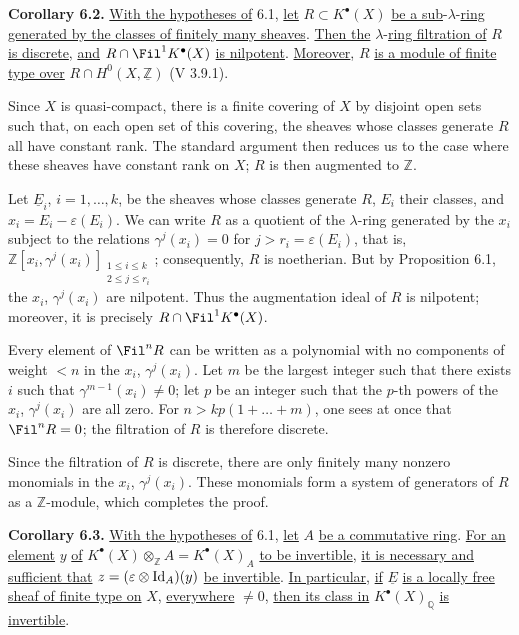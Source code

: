 %
\textbf{Corollary 6.2.} \uline{With the hypotheses of} 6.1, \uline{let} $R\subset K^{\bullet}(X)$ \uline{be a sub}-$\lambda$-\uline{ring generated by the classes of finitely many sheaves}. \uline{Then the} $\lambda$-\uline{ring filtration of} $R$ \uline{is discrete}, \uline{and} $R\cap\Fil^1K^{\bullet}(X)$ \uline{is nilpotent}. \uline{Moreover}, $R$ \uline{is a module of finite type over} $R\cap H^0(X,\underline{\mathbb Z})$ (V 3.9.1).

Since $X$ is quasi-compact, there is a finite covering of $X$ by disjoint open sets such that, on each open set of this covering, the sheaves whose classes generate $R$ all have constant rank. The standard argument then reduces us to the case where these sheaves have constant rank on $X$; $R$ is then augmented to $\mathbb Z$.

Let $\underline{E}_i$, $i=1,\ldots,k$, be the sheaves whose classes generate $R$, $E_i$ their classes, and $x_i=E_i-\varepsilon(E_i)$. We can write $R$ as a quotient of the $\lambda$-ring generated by the $x_i$ subject to the relations $\gamma^j(x_i)=0$ for $j>r_i=\varepsilon(E_i)$, that is, $\mathbb Z[x_i,\gamma^j(x_i)]_{\substack{1\le i\le k\\2\le j\le r_i}}$; consequently, $R$ is noetherian. But by Proposition 6.1, the $x_i$, $\gamma^j(x_i)$ are nilpotent. Thus the augmentation ideal of $R$ is nilpotent; moreover, it is precisely $R\cap\Fil^1K^{\bullet}(X)$.

Every element of $\Fil^n R$ can be written as a polynomial with no components of weight $<n$ in the $x_i$, $\gamma^j(x_i)$. Let $m$ be the largest integer such that there exists $i$ such that $\gamma^{m-1}(x_i)\ne0$; let $p$ be an integer such that the $p$-th powers of the $x_i$, $\gamma^j(x_i)$ are all zero. For $n>kp(1+\ldots+m)$, one sees at once that $\Fil^nR=0$; the filtration of $R$ is therefore discrete.

Since the filtration of $R$ is discrete, there are only finitely many nonzero monomials in the $x_i$, $\gamma^j(x_i)$. These monomials form a system of generators of $R$ as a $\mathbb Z$-module, which completes the proof.

%
\textbf{Corollary 6.3.} \uline{With the hypotheses of} 6.1, \uline{let} $A$ \uline{be a commutative ring}. \uline{For an element} $y$ \uline{of} $K^{\bullet}(X)\otimes_{\mathbb Z}A=K^{\bullet}(X)_A$ \uline{to be invertible}, \uline{it is necessary and sufficient that} $z=(\varepsilon\otimes\operatorname{Id}_A)(y)$ \uline{be invertible}. \uline{In particular}, \uline{if} $\underline{E}$ \uline{is a locally free sheaf of finite type on} $X$, \uline{everywhere} $\ne0$, \uline{then its class in} $K^{\bullet}(X)_{\mathbb Q}$ \uline{is invertible}.

